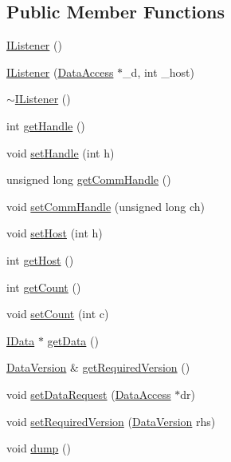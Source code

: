 \subsection*{Public Member Functions}
\begin{DoxyCompactItemize}
\item 
\hyperlink{class_i_listener_a580e07e9510e6566f2585942f40b16ba}{IListener} ()
\item 
\hyperlink{class_i_listener_a1eba797d318973c361a7d8ce023fb3eb}{IListener} (\hyperlink{struct_data_access}{DataAccess} $\ast$\_\-d, int \_\-host)
\item 
\hyperlink{class_i_listener_a9c66b3735fe70263e9717f50ac00cff9}{$\sim$IListener} ()
\item 
int \hyperlink{class_i_listener_a740d5ab9a48bdb21b107edd813e8b9ca}{getHandle} ()
\item 
void \hyperlink{class_i_listener_a4649d89b151d60d9c9fe82e5f3a7a98d}{setHandle} (int h)
\item 
unsigned long \hyperlink{class_i_listener_ad1ce06a966f81c212179acb6da9c4b9d}{getCommHandle} ()
\item 
void \hyperlink{class_i_listener_a808fd91db5dba945320316a8b6c99dca}{setCommHandle} (unsigned long ch)
\item 
void \hyperlink{class_i_listener_a0e9cfdf957b6e1fe454b7ca312115c2d}{setHost} (int h)
\item 
int \hyperlink{class_i_listener_a92be46f2fb958f6b52564e837d5fca98}{getHost} ()
\item 
int \hyperlink{class_i_listener_a3ccdeeabec88b3f0532aa2ced78797e8}{getCount} ()
\item 
void \hyperlink{class_i_listener_a9def0a8ed3ed91e1956b7b9ce1473b2e}{setCount} (int c)
\item 
\hyperlink{class_i_data}{IData} $\ast$ \hyperlink{class_i_listener_a26d2796b0c0f2fb59203140ddb0ee468}{getData} ()
\item 
\hyperlink{struct_data_version}{DataVersion} \& \hyperlink{class_i_listener_aee2a0174f44139725e4e19fdc3c4d94e}{getRequiredVersion} ()
\item 
void \hyperlink{class_i_listener_a338e30d25c88f4fd7ce341e666cddc0f}{setDataRequest} (\hyperlink{struct_data_access}{DataAccess} $\ast$dr)
\item 
void \hyperlink{class_i_listener_aa2cf7948e5d24cded10e026fe202ab62}{setRequiredVersion} (\hyperlink{struct_data_version}{DataVersion} rhs)
\item 
void \hyperlink{class_i_listener_ae53c9b5bd1067445dd09804efd04ea5c}{dump} ()

\end{DoxyCompactItemize}
